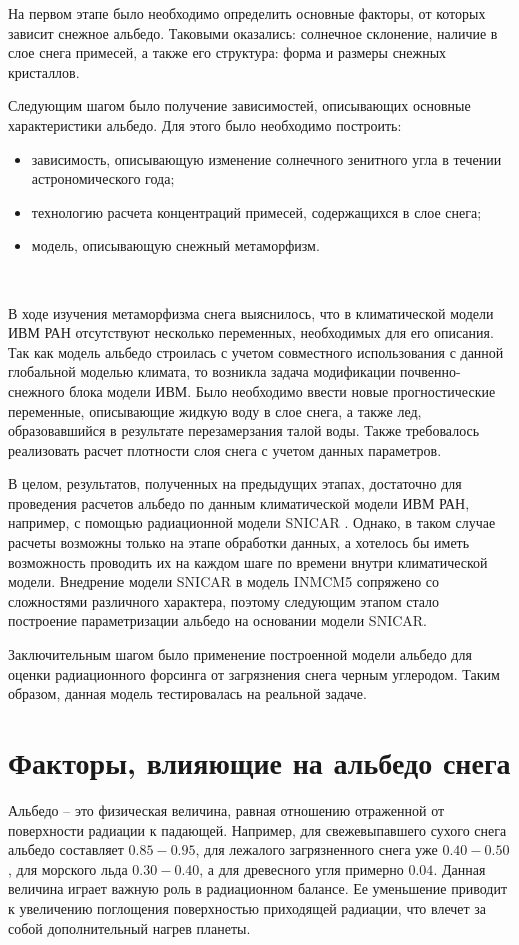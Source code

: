 \documentclass[a4paper, fontsize=14pt]{scrartcl}
\begin{document}
На первом этапе было необходимо определить основные факторы, от которых зависит снежное альбедо. Таковыми оказались: солнечное склонение, наличие в слое снега примесей, а также его структура: форма и размеры снежных кристаллов.

Следующим шагом было получение зависимостей, описывающих основные характеристики альбедо. Для этого было необходимо построить:
\begin{itemize}
    \item зависимость, описывающую изменение солнечного зенитного угла в течении астрономического года;
        \item технологию расчета концентраций примесей, содержащихся в слое снега;
        \item модель, описывающую снежный метаморфизм.
\end{itemize} 

~

В ходе изучения метаморфизма снега выяснилось, что в климатической модели ИВМ РАН отсутствуют несколько переменных, необходимых для его описания. Так как модель альбедо строилась с учетом совместного использования с данной глобальной моделью климата, то возникла задача модификации почвенно-снежного блока модели ИВМ. Было необходимо ввести новые прогностические переменные, описывающие жидкую воду в слое снега, а также лед, образовавшийся в результате перезамерзания талой воды. Также требовалось реализовать расчет плотности слоя снега с учетом данных параметров.

\newpage
В целом, результатов, полученных на предыдущих этапах, достаточно для проведения расчетов альбедо по данным климатической модели ИВМ РАН, например, с помощью радиационной модели SNICAR \cite{Flanner2007}. Однако, в таком случае расчеты возможны только на этапе обработки данных, а хотелось бы иметь возможность проводить их на каждом шаге по времени внутри климатической модели. Внедрение модели SNICAR в модель INMCM5 сопряжено со сложностями различного характера, поэтому следующим этапом стало построение параметризации альбедо на основании модели SNICAR. 

Заключительным шагом было применение построенной модели альбедо для оценки радиационного форсинга от загрязнения снега черным углеродом. Таким образом, данная модель тестировалась на реальной задаче. 


\newpage
\section{Факторы, влияющие на альбедо снега}\label{Chapter2}
Альбедо -- это физическая величина, равная отношению отраженной от поверхности радиации к падающей. Например, для свежевыпавшего сухого снега альбедо составляет $0.85-0.95$, для лежалого загрязненного снега уже $0.40-0.50$, для морского льда $0.30-0.40$, а для древесного угля примерно $0.04$. Данная величина играет важную роль в радиационном балансе. Ее уменьшение приводит к увеличению поглощения поверхностью приходящей радиации, что влечет за собой дополнительный нагрев планеты. 
\end{document}
